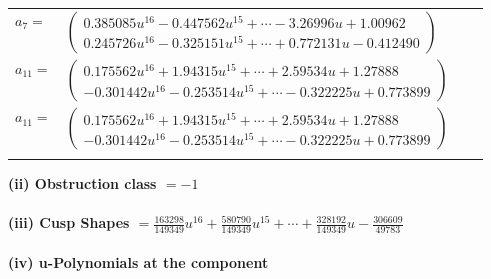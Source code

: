 \documentclass[1p]{elsarticle_modified}
\theoremstyle{definition}
\begin{document}
\begin{tabular}{m{7pt} m{180pt} m{7pt} m{180pt} }
\flushright $a_{7}=$&$\begin{pmatrix}0.385085 u^{16}-0.447562 u^{15}+\cdots-3.26996 u+1.00962\\0.245726 u^{16}-0.325151 u^{15}+\cdots+0.772131 u-0.412490\end{pmatrix}$ \\
\flushright $a_{11}=$&$\begin{pmatrix}0.175562 u^{16}+1.94315 u^{15}+\cdots+2.59534 u+1.27888\\-0.301442 u^{16}-0.253514 u^{15}+\cdots-0.322225 u+0.773899\end{pmatrix}$\\ \flushright $a_{11}=$&$\begin{pmatrix}0.175562 u^{16}+1.94315 u^{15}+\cdots+2.59534 u+1.27888\\-0.301442 u^{16}-0.253514 u^{15}+\cdots-0.322225 u+0.773899\end{pmatrix}$\\&\end{tabular}
\flushleft \textbf{(ii) Obstruction class $= -1$}\\~\\
\flushleft \textbf{(iii) Cusp Shapes $= \frac{163298}{149349} u^{16}+\frac{580790}{149349} u^{15}+\cdots+\frac{328192}{149349} u-\frac{306609}{49783}$}\\~\\
\newpage\renewcommand{\arraystretch}{1}
\flushleft \textbf{(iv) u-Polynomials at the component}\newline \\
\end{document}
